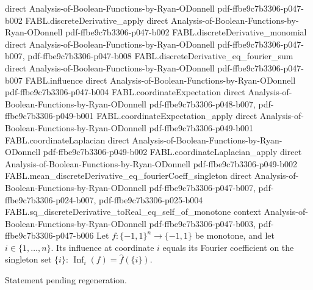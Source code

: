 \begin{theorem}
  {direct}
  {Analysis-of-Boolean-Functions-by-Ryan-ODonnell}
  {pdf-ffbe9c7b3306-p047-b002}
\proofstep
  {FABL.discreteDerivative_apply}
  {direct}
  {Analysis-of-Boolean-Functions-by-Ryan-ODonnell}
  {pdf-ffbe9c7b3306-p047-b002}
\proofstep
  {FABL.discreteDerivative_monomial}
  {direct}
  {Analysis-of-Boolean-Functions-by-Ryan-ODonnell}
  {pdf-ffbe9c7b3306-p047-b007,
    pdf-ffbe9c7b3306-p047-b008}
\proofstep
  {FABL.discreteDerivative_eq_fourier_sum}
  {direct}
  {Analysis-of-Boolean-Functions-by-Ryan-ODonnell}
  {pdf-ffbe9c7b3306-p047-b007}
\proofstep
  {FABL.influence}
  {direct}
  {Analysis-of-Boolean-Functions-by-Ryan-ODonnell}
  {pdf-ffbe9c7b3306-p047-b004}
\proofstep
  {FABL.coordinateExpectation}
  {direct}
  {Analysis-of-Boolean-Functions-by-Ryan-ODonnell}
  {pdf-ffbe9c7b3306-p048-b007,
    pdf-ffbe9c7b3306-p049-b001}
\proofstep
  {FABL.coordinateExpectation_apply}
  {direct}
  {Analysis-of-Boolean-Functions-by-Ryan-ODonnell}
  {pdf-ffbe9c7b3306-p049-b001}
\proofstep
  {FABL.coordinateLaplacian}
  {direct}
  {Analysis-of-Boolean-Functions-by-Ryan-ODonnell}
  {pdf-ffbe9c7b3306-p049-b002}
\proofstep
  {FABL.coordinateLaplacian_apply}
  {direct}
  {Analysis-of-Boolean-Functions-by-Ryan-ODonnell}
  {pdf-ffbe9c7b3306-p049-b002}
\proofstep
  {FABL.mean_discreteDerivative_eq_fourierCoeff_singleton}
  {direct}
  {Analysis-of-Boolean-Functions-by-Ryan-ODonnell}
  {pdf-ffbe9c7b3306-p047-b007,
    pdf-ffbe9c7b3306-p024-b007,
    pdf-ffbe9c7b3306-p025-b004}
\proofstep
  {FABL.sq_discreteDerivative_toReal_eq_self_of_monotone}
  {context}
  {Analysis-of-Boolean-Functions-by-Ryan-ODonnell}
  {pdf-ffbe9c7b3306-p047-b003,
    pdf-ffbe9c7b3306-p047-b006}
Let $f:\{-1,1\}^n\to\{-1,1\}$ be monotone, and let $i\in\{1,\ldots,n\}$. Its influence
at coordinate $i$ equals its Fourier coefficient on the singleton set $\{i\}$:
$\operatorname{Inf}_i(f)=\widehat f(\{i\})$.
\end{theorem}

\begin{theorem}
\label{FABL.fourierCoeff_singleton_eq_of_transitiveSymmetric}
\leanok
{}
Statement pending regeneration.
\end{theorem}

